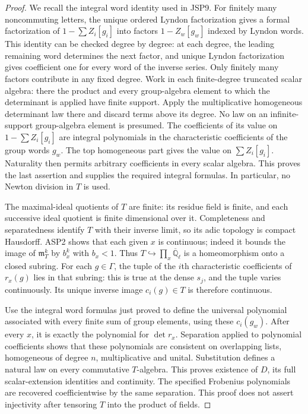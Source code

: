 \documentclass[11pt,a4paper]{article}
\numberwithin{equation}{section}
\theoremstyle{remark}\newtheorem{remark}[theorem]{Remark}
\begin{document}
\begin{proof}
We recall the integral word identity used in JSP9.  For finitely
many noncommuting letters, the unique ordered Lyndon factorization
gives a formal factorization of \(1-\sum Z_i[g_i]\) into
factors \(1-Z_w[g_w]\) indexed by Lyndon words.  This identity
can be checked degree by degree: at each degree, the leading
remaining word determines the next factor, and unique Lyndon
factorization gives coefficient one for every word of the inverse
series.  Only finitely many factors contribute in any fixed
degree.  Work in each finite-degree truncated scalar algebra:
there the product and every group-algebra element to which the
determinant is applied have finite support.  Apply the
multiplicative homogeneous determinant law there and discard
terms above its degree.  No law on an infinite-support
group-algebra element is presumed.  The coefficients of its value on
\(1-\sum Z_i[g_i]\) are integral polynomials in the
characteristic coefficients of the group words \(g_w\).
The top homogeneous part gives the value on
\(\sum Z_i[g_i]\).  Naturality then permits arbitrary
coefficients in every scalar algebra.  This proves the last
assertion and supplies the required integral formulas.  In
particular, no Newton division in \(T\) is used.

The maximal-ideal quotients of \(T\) are finite: its residue
field is finite, and each successive ideal quotient is finite
dimensional over it.  Completeness and separatedness identify
\(T\) with their inverse limit, so its adic topology is compact
Hausdorff.  ASP2 shows that each given \(x\) is continuous;
indeed it bounds the image of \(\mathfrak m_T^k\) by
\(b_x^k\) with \(b_x<1\).  Thus
\(T\hookrightarrow\prod_x\overline{\mathbb Q}_\ell\)
is a homeomorphism onto a closed subring.
For each \(g\in\Gamma\), the tuple of the \(i\)th
characteristic coefficients of \(r_x(g)\) lies in that subring:
this is true at the dense \(s_j\), and the tuple varies
continuously.  Its unique inverse image \(c_i(g)\in T\)
is therefore continuous.

Use the integral word formulas just proved to define the universal
polynomial associated with every finite sum of group elements,
using these \(c_i(g_w)\).  After every \(x\), it is exactly
the polynomial for \(\det r_x\).  Separation applied to
polynomial coefficients shows that these polynomials are
consistent on overlapping lists, homogeneous of degree \(n\),
multiplicative and unital.  Substitution defines a natural law
on every commutative \(T\)-algebra.  This proves existence of
\(D\), its full scalar-extension identities and continuity.
The specified Frobenius polynomials are recovered coefficientwise
by the same separation.  This proof does not assert injectivity
after tensoring \(T\) into the product of fields.
\end{proof}
\end{document}
